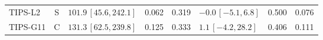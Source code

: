 \documentclass[10pt,a4paper]{article}
\begin{document}
\begin{longtable}{lcp{37mm}rrp{37mm}rr}
TIPS-L2 & S & \(101.9\,[45.6,242.1]\) & 0.062 & 0.319 & \(-0.0\,[-5.1,6.8]\) & 0.500 & 0.076\\
TIPS-G11 & C & \(131.3\,[62.5,239.8]\) & 0.125 & 0.333 & \(1.1\,[-4.2,28.2]\) & 0.406 & 0.111\\

\end{longtable}
\end{document}
